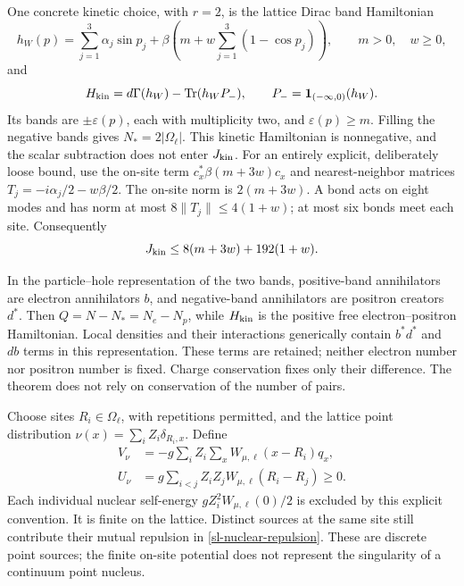 One concrete kinetic choice, with \(r=2\), is the lattice Dirac band
Hamiltonian
\begin{equation}
h_W(p)=\sum_{j=1}^3\alpha_j\sin p_j
 +\beta\left(m+w\sum_{j=1}^3(1-\cos p_j)\right),
\qquad m>0,\quad w\ge0,
\label{sl-wilson}
\end{equation}
and
\[
H_{\rm kin}=d\Gamma(h_W)-\operatorname{Tr}(h_WP_-),
\qquad P_-=\boldsymbol1_{(-\infty,0)}(h_W).
\]
Its bands are \(\pm\varepsilon(p)\), each with multiplicity two,
and \(\varepsilon(p)\ge m\). Filling the negative bands gives
\(N_*=2|\Omega_\ell|\). This kinetic Hamiltonian is nonnegative,
and the scalar subtraction does not enter \(J_{\rm kin}\).
For an entirely explicit, deliberately loose bound, use the on-site
term \(c_x^*\beta(m+3w)c_x\) and nearest-neighbor matrices
\(T_j=-i\alpha_j/2-w\beta/2\). The on-site norm is
\(2(m+3w)\). A bond acts on eight modes and has norm at most
\(8\|T_j\|\le4(1+w)\); at most six bonds meet each site.
Consequently
\begin{equation}
J_{\rm kin}\le8(m+3w)+192(1+w).
\label{sl-J-kinetic}
\end{equation}

In the particle--hole representation of the two bands, positive-band
annihilators are electron annihilators \(b\), and negative-band
annihilators are positron creators \(d^*\). Then
\(Q=N-N_*=N_e-N_p\), while \(H_{\rm kin}\) is the positive free
electron--positron Hamiltonian. Local densities and their interactions
generically contain \(b^*d^*\) and \(db\) terms in this representation.
These terms are retained; neither electron number nor positron number
is fixed. Charge conservation fixes only their difference. The theorem
does not rely on conservation of the number of pairs.

Choose sites \(R_i\in\Omega_\ell\), with repetitions permitted, and
the lattice point distribution
\(\nu(x)=\sum_iZ_i\delta_{R_i,x}\). Define
\begin{align}
V_\nu&=-g\sum_iZ_i\sum_xW_{\mu,\ell}(x-R_i)q_x,
\label{sl-source-potential}\\
U_\nu&=g\sum_{i<j}Z_iZ_jW_{\mu,\ell}(R_i-R_j)\ge0.
\label{sl-nuclear-repulsion}
\end{align}
Each individual nuclear self-energy
\(gZ_i^2W_{\mu,\ell}(0)/2\) is excluded by this explicit convention.
It is finite on the lattice. Distinct sources at the same site still
contribute their mutual repulsion in \eqref{sl-nuclear-repulsion}.
These are discrete point sources; the finite on-site potential does
not represent the singularity of a continuum point nucleus.

